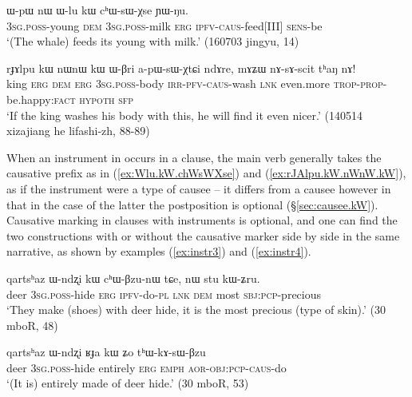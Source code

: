 \begin{exe}
\ex \label{ex:Wlu.kW.chWsWXse}
 \gll ɯ-pɯ nɯ ɯ-lu kɯ cʰɯ-sɯ-χse ɲɯ-ŋu. \\
 \textsc{3sg}.\textsc{poss}-young \textsc{dem} \textsc{3sg}.\textsc{poss}-milk \textsc{erg} \textsc{ipfv}-\textsc{caus}-feed[III] \textsc{sens}-be \\
\glt `(The whale) feeds its young with milk.' (160703 jingyu, 14)
\end{exe}

\begin{exe}
\ex \label{ex:rJAlpu.kW.nWnW.kW}
 \gll  rɟɤlpu kɯ nɯnɯ kɯ ɯ-βri a-pɯ-sɯ-χtɕi ndɤre, mɤʑɯ nɤ-sɤ-scit tʰaŋ nɤ!\\
 king \textsc{erg} \textsc{dem} \textsc{erg} \textsc{3sg}.\textsc{poss}-body \textsc{irr}-\textsc{pfv}-\textsc{caus}-wash \textsc{lnk} even.more \textsc{trop}-\textsc{prop}-be.happy:\textsc{fact} \textsc{hypoth} \textsc{sfp} \\
 \glt `If the king washes his body with this, he will find it even nicer.' (140514 xizajiang he lifashi-zh, 88-89)
\end{exe}

When an instrument in  occurs in a clause, the main verb generally takes the causative prefix as in (\ref{ex:Wlu.kW.chWsWXse}) and (\ref{ex:rJAlpu.kW.nWnW.kW}), as if the instrument were a type of causee -- it differs from a causee however in that in the case of the latter the postposition  is optional (§\ref{sec:causee.kW}). Causative marking in clauses with  instruments is optional, and one can find the two constructions with or without the causative marker side by side in the same narrative, as shown by examples (\ref{ex:instr3}) and (\ref{ex:instr4}).

\begin{exe} 
\ex \label{ex:instr3}
\gll   qartsʰaz  ɯ-ndʐi kɯ cʰɯ-βzu-nɯ tɕe, nɯ stu kɯ-ʑru.   \\
 deer \textsc{3sg}.\textsc{poss}-hide \textsc{erg} \textsc{ipfv}-do-\textsc{pl} \textsc{lnk} \textsc{dem} most \textsc{sbj}:\textsc{pcp}-precious \\
 \glt   `They make (shoes) with deer hide, it is the most precious (type of skin).' (30 mboR, 48)
\end{exe} 

 \begin{exe} 
\ex \label{ex:instr4}
\gll   qartsʰaz ɯ-ndʐi ʁɟa kɯ ʑo tʰɯ-kɤ-sɯ-βzu  \\
 deer \textsc{3sg}.\textsc{poss}-hide entirely \textsc{erg} \textsc{emph} \textsc{aor}-\textsc{obj}:\textsc{pcp}-\textsc{caus}-do\\
 \glt   `(It is) entirely made of deer hide.' (30 mboR, 53)
\end{exe} 

